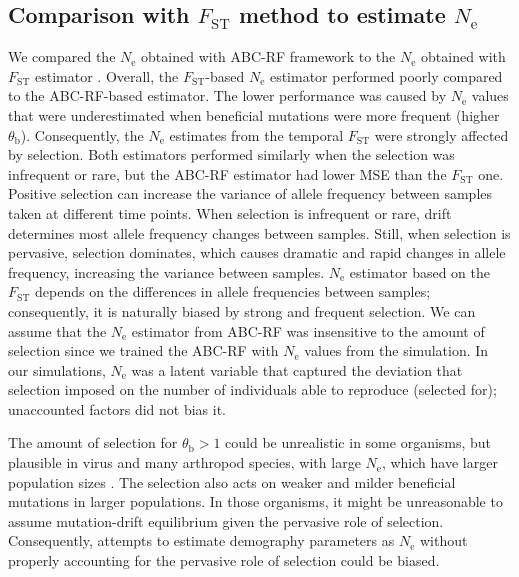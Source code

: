 \documentclass[a4paper, 12pt]{article}
\begin{document}
\subsection*{Comparison with $F_{\mathrm{ST}}$ method to estimate $N_\mathrm{e}$}

We compared the $N_{\mathrm{e}}$ obtained with ABC-RF framework to the $N_{\mathrm{e}}$ obtained with $F_{\mathrm{ST}}$ estimator \citep{Frachon:2017fw}. Overall, the $F_{\mathrm{ST}}$-based $N_{\mathrm{e}}$ estimator performed poorly compared to the ABC-RF-based estimator. The lower performance was caused by $N_{\mathrm{e}}$ values that were underestimated when beneficial mutations were more frequent (higher $\theta_{\mathrm{b}}$). Consequently, the $N_{\mathrm{e}}$ estimates from the temporal $F_{\mathrm{ST}}$ were strongly affected by selection. Both estimators performed similarly when the selection was infrequent or rare, but the ABC-RF estimator had lower MSE than the $F_{\mathrm{ST}}$ one. Positive selection can increase the variance of allele frequency between samples taken at different time points. When selection is infrequent or rare, drift determines most allele frequency changes between samples. Still, when selection is pervasive, selection dominates, which causes dramatic and rapid changes in allele frequency, increasing the variance between samples. $N_{\mathrm{e}}$ estimator based on the $F_{\mathrm{ST}}$ depends on the differences in allele frequencies between samples; consequently, it is naturally biased by strong and frequent selection. We can assume that the $N_{\mathrm{e}}$ estimator from ABC-RF was insensitive to the amount of selection since we trained the ABC-RF with $N_{\mathrm{e}}$ values from the simulation. In our simulations, $N_{\mathrm{e}}$ was a latent variable that captured the deviation that selection imposed on the number of individuals able to reproduce (selected for); unaccounted factors did not bias it. 

The amount of selection for $\theta_{\mathrm{b}} > 1$ could be unrealistic in some organisms, but plausible in virus \citep{Feder:2014fe} and many arthropod species, with large $N_{\mathrm{e}}$, which have larger population sizes \citep[except in eusocial insects that have vertebrate-like population sizes;][]{Romiguier:2014dh}. The selection also acts on weaker and milder beneficial mutations in larger populations. In those organisms, it might be unreasonable to assume mutation-drift equilibrium given the pervasive role of selection. Consequently, attempts to estimate demography parameters as $N_{\mathrm{e}}$ without properly accounting for the pervasive role of selection could be biased.
\end{document}

